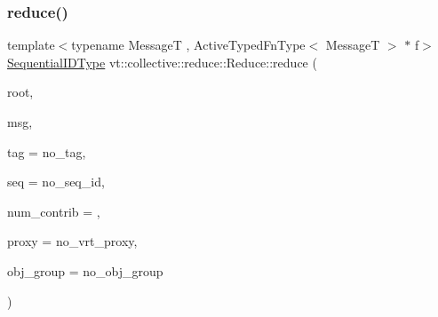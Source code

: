 \subsubsection{\texorpdfstring{reduce()}{reduce()}\hspace{0.1cm}{\footnotesize\ttfamily [1/3]}}
{\footnotesize\ttfamily template$<$typename MessageT , Active\+Typed\+Fn\+Type$<$ Message\+T $>$ $\ast$ f$>$ \\
\hyperlink{namespacevt_a3063d4db3b879d6dd2c7b8d50995c7f6}{Sequential\+I\+D\+Type} vt\+::collective\+::reduce\+::\+Reduce\+::reduce (\begin{DoxyParamCaption}\item[{\hyperlink{namespacevt_a866da9d0efc19c0a1ce79e9e492f47e2}{Node\+Type}}]{root,  }\item[{MessageT $\ast$const}]{msg,  }\item[{\hyperlink{namespacevt_a84ab281dae04a52a4b243d6bf62d0e52}{Tag\+Type}}]{tag = {\ttfamily no\+\_\+tag},  }\item[{\hyperlink{namespacevt_a3063d4db3b879d6dd2c7b8d50995c7f6}{Sequential\+I\+D\+Type}}]{seq = {\ttfamily no\+\_\+seq\+\_\+id},  }\item[{\hyperlink{structvt_1_1collective_1_1reduce_1_1_reduce_a6fd4d5e956ac5acd321e57c7dad5131f}{Reduce\+Num\+Type}}]{num\+\_\+contrib = {},  }\item[{\hyperlink{namespacevt_a1b417dd5d684f045bb58a0ede70045ac}{Virtual\+Proxy\+Type}}]{proxy = {\ttfamily no\+\_\+vrt\+\_\+proxy},  }\item[{\hyperlink{namespacevt_ad7cae989df485fccca57f0792a880a8e}{Obj\+Group\+Proxy\+Type}}]{obj\+\_\+group = {\ttfamily no\+\_\+obj\+\_\+group} }\end{DoxyParamCaption})}

\mbox{\label{structvt_1_1collective_1_1reduce_1_1_reduce_afc83acfdd53b377d632084a6c50dfb7b}} 
